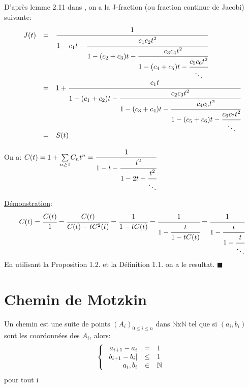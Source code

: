 		\begin{proposition}
			\begin{rm}
				D'après lemme 2.11 dans \cite{ref30}, on a la J-fraction (ou fraction continue de Jacobi) suivante:
				\[
				\begin{array}{l l l}
				
					J(t) &=& \cfrac{1}{1-c_{1}t-\cfrac{c_{1}c_{2}t^2}{1-(c_{2}+c_{3})t-\cfrac{c_{3}c_{4}t^2}{1-(c_{4}+c_{5})t-\cfrac{c_{5}c_{6}t^2}{\ddots}}}}\\

					&=& 1+\cfrac{c_{1}t}{1-(c_{1}+c_{2})t-\cfrac{c_{2}c_{3}t^2}{1-(c_{3}+c_{4})t-\cfrac{c_{4}c_{5}t^2}{1-(c_{5}+c_{6})t-\cfrac{c_{6}c_{7}t^2}{\ddots}}}}\\

					&=& S(t)
				\end{array}
				\]
			\end{rm}
		\end{proposition}	

		\begin{proposition}
			On a: $C(t) = 1+ \underset{n\geq 1}{\sum}C_{n}t^n = \cfrac{1}{1-t-\cfrac{t^2}{1-2t-\cfrac{t^2}{\ddots}}} $
		\end{proposition}
		\underline{Démonstration}:\\
		\[
		C(t) = \cfrac{C(t)}{1}=\cfrac{C(t)}{C(t)-tC^2(t)}=\cfrac{1}{1-tC(t)}= \cfrac{1}{1-\cfrac{t}{1-tC(t)}} = \cfrac{1}{1-\cfrac{t}{1-\cfrac{t}{\ddots}}} 
		\]
		En utilisant la Proposition 1.2. et la Définition 1.1. on a le resultat. $\blacksquare$

	\section{Chemin de Motzkin}

		\begin{definition}
			\begin{rm}
				Un chemin est une suite de points $(A_{i})_{0\leq i\leq n}$ dans $\mathbb{N}\text{x}\mathbb{N}$ tel que si $(a_{i},b_{i})$ sont les coordonnées des $A_{i}$, alors:
				\[
				\left \{ \begin{array}{r c l}
				a_{i+1}-a_{i}&=&1\\

				|b_{i+1}-b_{i}|&\leq&1 \\

				a_{i},b_{i}&\in& \mathbb{N}
				\end{array}
				\right.
				\] pour tout i 
			\end{rm}
		\end{definition}

